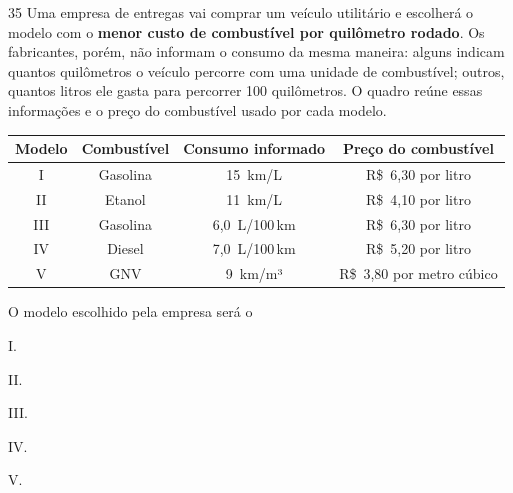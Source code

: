 \begin{questaoinedita}{3}{5}
Uma empresa de entregas vai comprar um veículo utilitário e escolherá o modelo com o
\textbf{menor custo de combustível por quilômetro rodado}. Os fabricantes, porém, não
informam o consumo da mesma maneira: alguns indicam quantos quilômetros o veículo
percorre com uma unidade de combustível; outros, quantos litros ele gasta para
percorrer 100 quilômetros. O quadro reúne essas informações e o preço do combustível
usado por cada modelo.

\begin{center}
\small
\begin{tabular}{cccc}
\toprule
\textbf{Modelo} & \textbf{Combustível} & \textbf{Consumo informado} & \textbf{Preço do combustível}\\
\midrule
I   & Gasolina & 15~km/L       & R\$~6,30 por litro\\
II  & Etanol   & 11~km/L       & R\$~4,10 por litro\\
III & Gasolina & 6,0~L/100\,km & R\$~6,30 por litro\\
IV  & Diesel   & 7,0~L/100\,km & R\$~5,20 por litro\\
V   & GNV      & 9~km/m³       & R\$~3,80 por metro cúbico\\
\bottomrule
\end{tabular}
\end{center}

O modelo escolhido pela empresa será o
\begin{alternativas*}[5]
  \item I.
  \item II.
  \item III.
  \item IV.
  \item V.
\end{alternativas*}
\end{questaoinedita}
